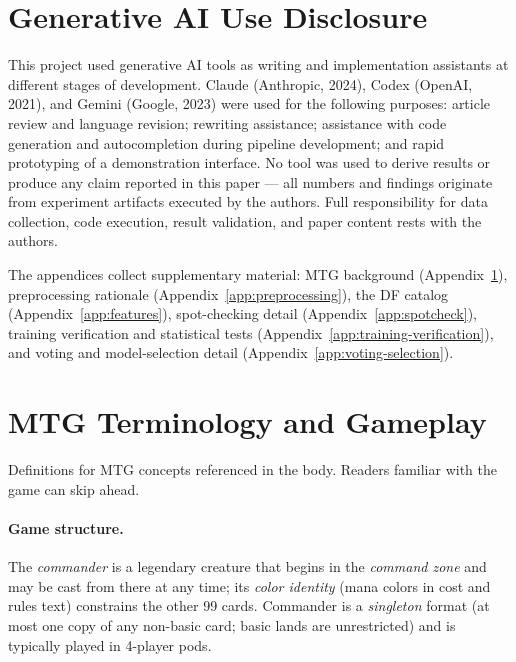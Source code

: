 \documentclass{article}
\begin{document}
\section*{Generative AI Use Disclosure}

This project used generative AI tools as writing and implementation assistants at different stages of development. Claude (Anthropic, 2024)\nocite{anthropic2024claude}, Codex (OpenAI, 2021)\nocite{openai2021codex}, and Gemini (Google, 2023)\nocite{google2023gemini} were used for the following purposes: article review and language revision; rewriting assistance; assistance with code generation and autocompletion during pipeline development; and rapid prototyping of a demonstration interface. No tool was used to derive results or produce any claim reported in this paper --- all numbers and findings originate from experiment artifacts executed by the authors. Full responsibility for data collection, code execution, result validation, and paper content rests with the authors.




\appendix

\smallskip
The appendices collect supplementary material: MTG background (Appendix~\ref{app:mtg}), preprocessing rationale (Appendix~\ref{app:preprocessing}), the DF catalog (Appendix~\ref{app:features}), spot-checking detail (Appendix~\ref{app:spotcheck}), training verification and statistical tests (Appendix~\ref{app:training-verification}), and voting and model-selection detail (Appendix~\ref{app:voting-selection}).

\section{MTG Terminology and Gameplay}
\label{app:mtg}

Definitions for MTG concepts referenced in the body. Readers familiar with the game can skip ahead.

\paragraph{Game structure.} The \textit{commander} is a legendary creature that begins in the \textit{command zone} and may be cast from there at any time; its \textit{color identity} (mana colors in cost and rules text) constrains the other 99 cards. Commander is a \textit{singleton} format (at most one copy of any non-basic card; basic lands are unrestricted) and is typically played in 4-player pods.
\end{document}
